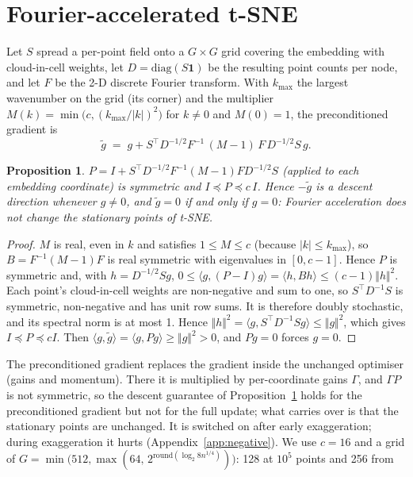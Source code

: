 \documentclass[11pt]{article}
\newtheorem{proposition}{Proposition}
\begin{document}
\section{Fourier-accelerated t-SNE}\label{sec:method}
Let $S$ spread a per-point field onto a $G\times G$ grid covering the embedding with cloud-in-cell weights, let
$D=\mathrm{diag}(S\mathbf 1)$ be the resulting point counts per node, and let $F$ be the 2-D discrete Fourier
transform. With $k_{\max}$ the largest wavenumber on the grid (its corner) and the multiplier
$M(k)=\min\!\big(c,(k_{\max}/|k|)^2\big)$ for $k\neq0$ and $M(0)=1$, the
preconditioned gradient is
\begin{equation}
  \tilde g \;=\; g + S^\top D^{-1/2}F^{-1}\,(M-1)\,F\,D^{-1/2}S\,g .
\end{equation}
\begin{proposition}\label{prop:spd}
$P=I+S^\top D^{-1/2}F^{-1}(M-1)FD^{-1/2}S$ (applied to each embedding coordinate) is symmetric and
$I\preceq P\preceq c\,I$. Hence $-\tilde g$ is a descent direction whenever $g\ne0$, and $\tilde g=0$ if and
only if $g=0$: Fourier acceleration does not change the stationary points of t-SNE.
\end{proposition}
\begin{proof}
$M$ is real, even in $k$ and satisfies $1\le M\le c$ (because $|k|\le k_{\max}$), so $B=F^{-1}(M-1)F$ is real
symmetric with eigenvalues in $[0,c-1]$. Hence $P$ is symmetric and, with $h=D^{-1/2}Sg$,
$0\le\langle g,(P-I)g\rangle=\langle h,Bh\rangle\le(c-1)\Vert h\Vert^2$. Each point's cloud-in-cell weights
are non-negative and sum to one, so $S^\top D^{-1}S$ is symmetric, non-negative and has unit row sums. It is
therefore doubly stochastic, and its spectral norm is at most 1. Hence
$\Vert h\Vert^2=\langle g,S^\top D^{-1}Sg\rangle\le\Vert g\Vert^2$, which gives $I\preceq P\preceq cI$. Then
$\langle g,\tilde g\rangle=\langle g,Pg\rangle\ge\Vert g\Vert^2>0$, and $Pg=0$ forces $g=0$.
\end{proof}
The preconditioned gradient replaces the gradient inside the unchanged optimiser (gains and momentum). There
it is multiplied by per-coordinate gains $\Gamma$, and $\Gamma P$ is not symmetric, so the descent guarantee of
Proposition~\ref{prop:spd} holds for the preconditioned gradient but not for the full update; what carries over
is that the stationary points are unchanged. It is switched on after early exaggeration; during exaggeration it
hurts (Appendix~\ref{app:negative}). We use $c=16$ and a grid of
$G=\min\!\big(512,\max(64,\,2^{\mathrm{round}(\log_2 8n^{1/4})})\big)$: 128 at $10^5$ points and 256 from
\end{document}
